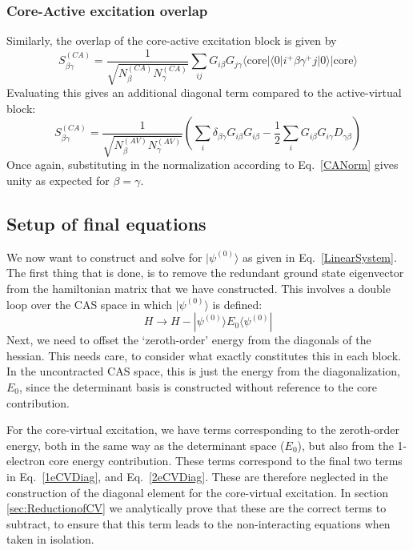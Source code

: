 \documentclass[a4paper,oneside,11pt]{article}
\numberwithin{equation}{section}
\newcommand{\DMETBra}{\langle \mathrm{core}|\langle 0|}
\newcommand{\DMETKet}{|0\rangle| \mathrm{core} \rangle}
\begin{document}
\subsubsection{Core-Active excitation overlap}
Similarly, the overlap of the core-active excitation block is given by
\begin{equation}
S^{(CA)}_{\beta \gamma} = \frac{1}{\sqrt{N^{(CA)}_{\beta} N^{(CA)}_{\gamma}}} \sum_{ij} G_{i \beta} G_{j \gamma} \DMETBra i^{+} \beta \gamma^{+} j \DMETKet
\end{equation}
Evaluating this gives an additional diagonal term compared to the active-virtual block:
\begin{equation}
S^{(CA)}_{\beta \gamma} = \frac{1}{\sqrt{N^{(AV)}_{\beta} N^{(AV)}_{\gamma}}} \left ( \sum_i \delta_{\beta \gamma} G_{i \beta} G_{i \beta} - \frac{1}{2} \sum_{i} G_{i \beta} G_{i \gamma} D_{\gamma \beta} \right)
\end{equation}
Once again, substituting in the normalization according to Eq.~\ref{CANorm} gives unity as expected for $\beta = \gamma$.

\subsection{Setup of final equations}

We now want to construct and solve for $|\psi^{(0)} \rangle$ as given in Eq.~\ref{LinearSystem}. The first thing that is done, is to remove the redundant ground state eigenvector from the hamiltonian
matrix that we have constructed. This involves a double loop over the CAS space in which $|\psi^{(0)} \rangle$ is defined:
\begin{equation}
H \rightarrow H - |\psi^{(0)} \rangle E_0 \langle \psi^{(0)} |
\end{equation}
Next, we need to offset the `zeroth-order' energy from the diagonals of the hessian. This needs care, to consider what exactly constitutes this in each block. In the uncontracted CAS space, this is 
just the energy from the diagonalization, $E_0$, since the determinant basis is constructed without reference to the core contribution.

For the core-virtual excitation, we have terms corresponding to the zeroth-order energy, both in the same way as the determinant space ($E_0$), but also from the 1-electron core energy contribution.
These terms correspond to the final two terms in Eq.~\ref{1eCVDiag}, and Eq.~\ref{2eCVDiag}. These are therefore neglected in the construction of the diagonal element for the core-virtual excitation. In 
section \ref{sec:ReductionofCV} we analytically prove that these are the correct terms to subtract, to ensure that this term leads to the non-interacting equations when taken in isolation.
\end{document}
